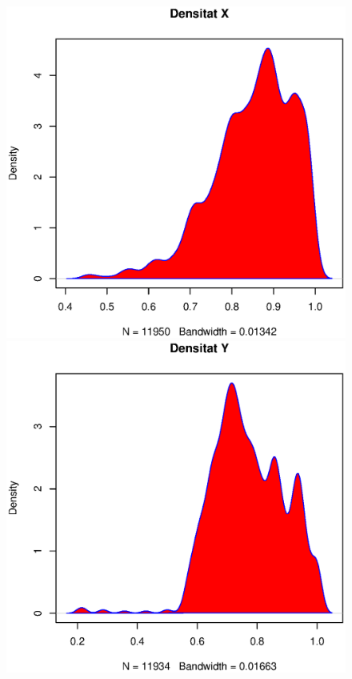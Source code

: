 \begin{figure}[h!]
\begin{minipage}{0.5\linewidth}
\includegraphics[width=1\linewidth]{./images/no_DENS.eps}
\caption{}
\end{minipage}
\hfill
\begin{minipage}{0.5\linewidth}
\includegraphics[width=1\linewidth]{./images/si_DENS.eps}
\caption{}
\end{minipage}
\end{figure}

